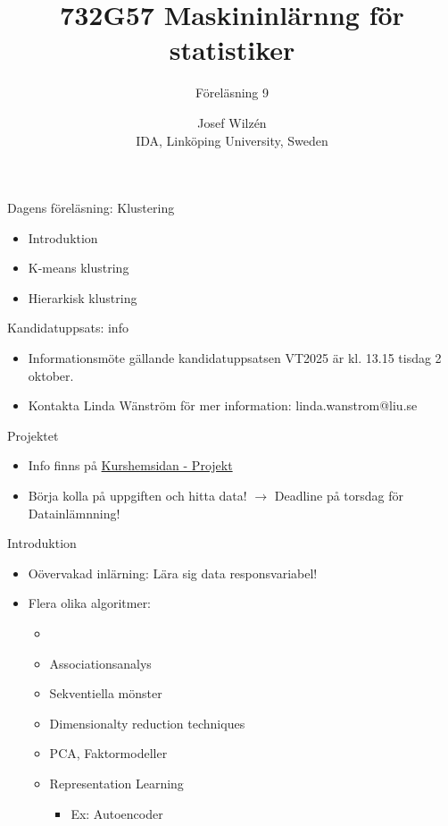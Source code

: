 \documentclass[10pt,english]{beamer}
\title{732G57 Maskininlärnng för statistiker}
\subtitle{Föreläsning 9}
\date{}
\author{Josef Wilzén \\ IDA, Linköping University, Sweden}
\begin{document}
\maketitle

\begin{frame}{Dagens föreläsning: Klustering}

    \begin{itemize}
        \item Introduktion
        \item K-means klustring
        \item Hierarkisk klustring
    \end{itemize}
    
\end{frame}


\begin{frame}{Kandidatuppsats: info}

  \begin{itemize}
        \item  Informationsmöte gällande kandidatuppsatsen VT2025 är kl. 13.15 tisdag 2 oktober.
        \item Kontakta Linda Wänström för mer information: linda.wanstrom@liu.se
    \end{itemize}

\end{frame}


\begin{frame}{Projektet}
    \begin{itemize}
        \item Info finns på \href{https://www.ida.liu.se/~732G12/info/courseinfo.sv.shtml\#projekt}{Kurshemsidan - Projekt}
        \item Börja kolla på uppgiften och hitta data! $\rightarrow$ Deadline på torsdag för Datainlämnning!
    \end{itemize}
\end{frame}

\begin{frame}{Introduktion}
    \begin{itemize}
        \item Oövervakad inlärning: Lära sig data  responsvariabel!
        \item Flera olika algoritmer:
        \begin{itemize}
            \item {}
            \item Associationsanalys
            \item Sekventiella mönster
            \item Dimensionalty reduction techniques
            \item PCA, Faktormodeller
            \item Representation Learning
            \begin{itemize}
              \item Ex: Autoencoder
            \end{itemize}
        \end{itemize}
    \end{itemize}
\end{frame}
\end{document}
